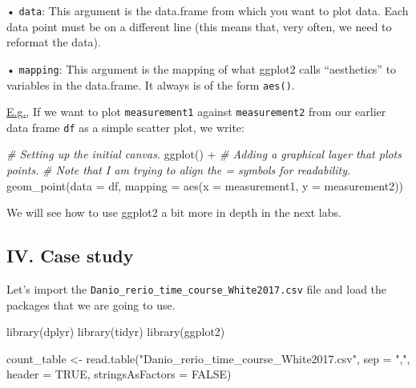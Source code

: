 \documentclass[
]{article}
\newenvironment{Shaded}{\begin{snugshade}}{\end{snugshade}}
\newcommand{\AttributeTok}[1]{\textcolor[rgb]{0.77,0.63,0.00}{#1}}
\newcommand{\CommentTok}[1]{\textcolor[rgb]{0.56,0.35,0.01}{\textit{#1}}}
\newcommand{\ConstantTok}[1]{\textcolor[rgb]{0.00,0.00,0.00}{#1}}
\newcommand{\FunctionTok}[1]{\textcolor[rgb]{0.00,0.00,0.00}{#1}}
\newcommand{\NormalTok}[1]{#1}
\newcommand{\OtherTok}[1]{\textcolor[rgb]{0.56,0.35,0.01}{#1}}
\newcommand{\SpecialCharTok}[1]{\textcolor[rgb]{0.00,0.00,0.00}{#1}}
\newcommand{\StringTok}[1]{\textcolor[rgb]{0.31,0.60,0.02}{#1}}
\begin{document}
• \texttt{data}: This argument is the data.frame from which you want to
plot data. Each data point must be on a different line (this means that,
very often, we need to reformat the data).

• \texttt{mapping}: This argument is the mapping of what ggplot2 calls
``aesthetics'' to variables in the data.frame. It always is of the form
\texttt{aes()}.

\underline{E.g.}, If we want to plot \texttt{measurement1} against
\texttt{measurement2} from our earlier data frame \texttt{df} as a
simple scatter plot, we write:

\begin{Shaded}
\begin{Highlighting}[]
\CommentTok{\# Setting up the initial canvas.}
\FunctionTok{ggplot}\NormalTok{() }\SpecialCharTok{+}
  \CommentTok{\# Adding a graphical layer that plots points.}
  \CommentTok{\# Note that I am trying to align the = symbols for readability.}
  \FunctionTok{geom\_point}\NormalTok{(}\AttributeTok{data    =}\NormalTok{ df,}
             \AttributeTok{mapping =} \FunctionTok{aes}\NormalTok{(}\AttributeTok{x =}\NormalTok{ measurement1, }\AttributeTok{y =}\NormalTok{ measurement2))}
\end{Highlighting}
\end{Shaded}

We will see how to use ggplot2 a bit more in depth in the next labs.

\hypertarget{iv.-case-study}{%
\subsection{IV. Case study}\label{iv.-case-study}}

Let's import the \texttt{Danio\_rerio\_time\_course\_White2017.csv} file
and load the packages that we are going to use.

\begin{Shaded}
\begin{Highlighting}[]
\FunctionTok{library}\NormalTok{(dplyr)}
\FunctionTok{library}\NormalTok{(tidyr)}
\FunctionTok{library}\NormalTok{(ggplot2)}

\NormalTok{count\_table }\OtherTok{\textless{}{-}} \FunctionTok{read.table}\NormalTok{(}\StringTok{"Danio\_rerio\_time\_course\_White2017.csv"}\NormalTok{, }
                          \AttributeTok{sep =} \StringTok{","}\NormalTok{, }\AttributeTok{header =} \ConstantTok{TRUE}\NormalTok{, }\AttributeTok{stringsAsFactors =} \ConstantTok{FALSE}\NormalTok{)}
\end{Highlighting}
\end{Shaded}
\end{document}

